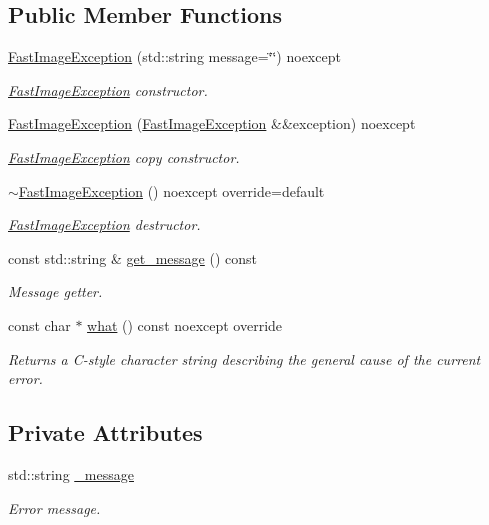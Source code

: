 \subsection*{Public Member Functions}
\begin{DoxyCompactItemize}
\item 
\hyperlink{classfi_1_1FastImageException_a0c33cb505f265f4f5a8501500b90795a}{Fast\+Image\+Exception} (std\+::string message=\char`\"{}\char`\"{}) noexcept
\begin{DoxyCompactList}\small\item\em \hyperlink{classfi_1_1FastImageException}{Fast\+Image\+Exception} constructor. \end{DoxyCompactList}\item 
\hyperlink{classfi_1_1FastImageException_a96ff2db20c0f2ba43ed962afa999c5fb}{Fast\+Image\+Exception} (\hyperlink{classfi_1_1FastImageException}{Fast\+Image\+Exception} \&\&exception) noexcept
\begin{DoxyCompactList}\small\item\em \hyperlink{classfi_1_1FastImageException}{Fast\+Image\+Exception} copy constructor. \end{DoxyCompactList}\item 
\hyperlink{classfi_1_1FastImageException_aee6254b5bad18046029c39f4d7688463}{$\sim$\+Fast\+Image\+Exception} () noexcept override=default
\begin{DoxyCompactList}\small\item\em \hyperlink{classfi_1_1FastImageException}{Fast\+Image\+Exception} destructor. \end{DoxyCompactList}\item 
const std\+::string \& \hyperlink{classfi_1_1FastImageException_afea494cd1b0bfe73da9eb6865228aec3}{get\+\_\+message} () const
\begin{DoxyCompactList}\small\item\em Message getter. \end{DoxyCompactList}\item 
const char $\ast$ \hyperlink{classfi_1_1FastImageException_ac07476e6ffb78d5411865012d9527a93}{what} () const noexcept override
\begin{DoxyCompactList}\small\item\em Returns a C-\/style character string describing the general cause of the current error. \end{DoxyCompactList}\end{DoxyCompactItemize}
\subsection*{Private Attributes}
\begin{DoxyCompactItemize}
\item 
std\+::string \hyperlink{classfi_1_1FastImageException_aae758858090a83245d8bd58fd86aab6e}{\+\_\+message}
\begin{DoxyCompactList}\small\item\em Error message. \end{DoxyCompactList}\end{DoxyCompactItemize}


